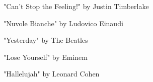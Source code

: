 \documentclass[]{article} %
\begin{document}
"Can't Stop the Feeling!" by Justin Timberlake %


"Nuvole Bianche" by Ludovico Einaudi %

"Yesterday" by The Beatles %

"Lose Yourself" by Eminem %

"Hallelujah" by Leonard Cohen %
\end{document}
